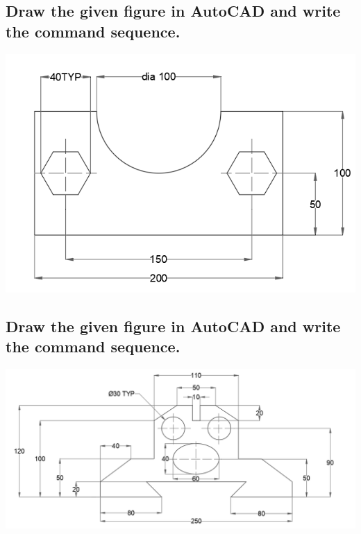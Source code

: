 \documentclass[a4paper, 12pt]{article}
\begin{document}
\subsection{Draw the given figure in AutoCAD and write the command sequence.}
\begin{center}
    \includegraphics{gfx/l2t2.PNG}
\end{center}
\subsection{Draw the given figure in AutoCAD and write the command sequence.}
\begin{center}
    \includegraphics[scale = 0.6]{gfx/l2t3.PNG}
\end{center}
\end{document}
